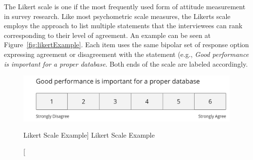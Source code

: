     The Likert scale is one if the most frequently used form of attitude measurement in survey research. Like most psychometric scale measures, the Likerts scale employs the approach to list multiple statements that the interviewees can rank corresponding to their level of agreement. An example can be seen at Figure~\vref{fig:likertExample}. Each item uses the same bipolar set of response option expressing agreement or disagreement with the statement (e.g., \textit{Good performance is important for a proper database}. Both ends of the scale are labeled accordingly. \autocite{Brill2008LikertScale}
    
    \begin{figure}[ht]
        \includegraphics[width=\linewidth]{images/methodology/likert.PNG}\centering
        \caption
        [Likert Scale Example]
        {Likert Scale Example}
        \label{fig:likertExample}
    \end{figure}
    
    

